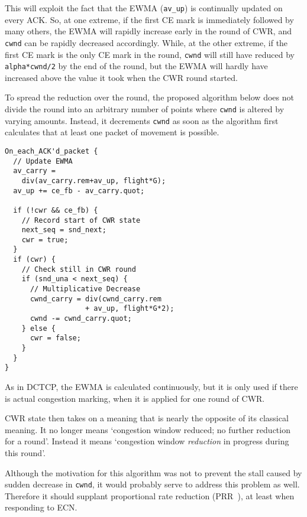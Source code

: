 This will exploit the fact that the EWMA (\texttt{av\_up}) is continually
updated on every ACK. So, at one extreme, if the first CE mark is immediately
followed by many others, the EWMA will rapidly increase early in the round of
CWR, and \texttt{cwnd} can be rapidly decreased accordingly. While, at the other
extreme, if the first CE mark is the only CE mark in the round, \texttt{cwnd}
will still have reduced by \texttt{alpha*cwnd/2} by the end of the round, but
the EWMA will hardly have increased above the value it took when the CWR round
started. 

To spread the reduction over the round, the proposed algorithm below does not
divide the round into an arbitrary number of points where \texttt{cwnd} is
altered by varying amounts. Instead, it decrements \texttt{cwnd} as soon as the
algorithm first calculates that at least one packet of movement is possible. 

\begin{verbatim}
On_each_ACK'd_packet {
  // Update EWMA
  av_carry = 
    div(av_carry.rem+av_up, flight*G);
  av_up += ce_fb - av_carry.quot;

  if (!cwr && ce_fb) {
    // Record start of CWR state
    next_seq = snd_next;
    cwr = true;
  }
  if (cwr) {
    // Check still in CWR round
    if (snd_una < next_seq) {
      // Multiplicative Decrease
      cwnd_carry = div(cwnd_carry.rem 
                   + av_up, flight*G*2);
      cwnd -= cwnd_carry.quot;
    } else {
      cwr = false;
    }
  }
}
\end{verbatim}

As in DCTCP, the EWMA is calculated continuously, but it is only used if there
is actual congestion marking, when it is applied for one round of CWR. %

CWR state then takes on a meaning that is nearly the opposite of its classical
meaning. It no longer means `congestion window reduced; no further reduction for
a round'. Instead it means `congestion window \emph{reduction} in progress
during this round'. 

Although the motivation for this algorithm was not to prevent the stall caused
by sudden decrease in \texttt{cwnd}, it would probably serve to address this
problem as well. Therefore it should supplant proportional rate reduction
(PRR~\cite{IETF_RFC6937:PRR}), at least when responding to ECN.

